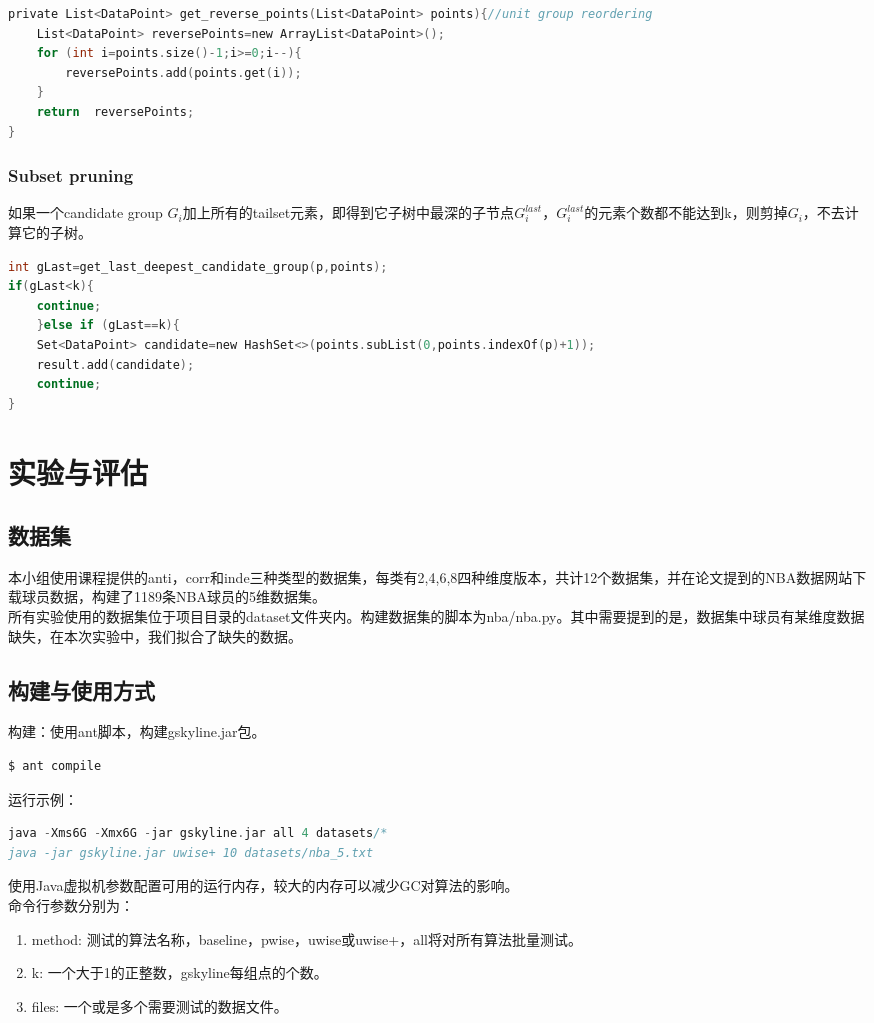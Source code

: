 \documentclass{article}
\begin{document}
\begin{CJK}{UTF8}{gbsn}
\begin{lstlisting}[language=C]
private List<DataPoint> get_reverse_points(List<DataPoint> points){//unit group reordering
    List<DataPoint> reversePoints=new ArrayList<DataPoint>();
    for (int i=points.size()-1;i>=0;i--){
        reversePoints.add(points.get(i));
    }
    return  reversePoints;
}
\end{lstlisting}

\subsubsection{Subset pruning}

如果一个candidate group $G_{i}$加上所有的tailset元素，即得到它子树中最深的子节点$G_{i}^{last}$，$G_{i}^{last}$的元素个数都不能达到k，则剪掉$G_{i}$，不去计算它的子树。
\begin{lstlisting}[language=C]
int gLast=get_last_deepest_candidate_group(p,points);
if(gLast<k){
    continue;
    }else if (gLast==k){
    Set<DataPoint> candidate=new HashSet<>(points.subList(0,points.indexOf(p)+1));
    result.add(candidate);
    continue;
}
\end{lstlisting}

\section{实验与评估}
\subsection{数据集}
本小组使用课程提供的anti，corr和inde三种类型的数据集，每类有2,4,6,8四种维度版本，共计12个数据集，并在论文提到的NBA数据网站下载球员数据，构建了1189条NBA球员的5维数据集。\\
所有实验使用的数据集位于项目目录的dataset文件夹内。构建数据集的脚本为nba/nba.py。其中需要提到的是，数据集中球员有某维度数据缺失，在本次实验中，我们拟合了缺失的数据。
\subsection{构建与使用方式}
构建：使用ant脚本，构建gskyline.jar包。\\
\begin{lstlisting}[language=C]
$ ant compile
\end{lstlisting}
运行示例：
\begin{lstlisting}[language=C]
java -Xms6G -Xmx6G -jar gskyline.jar all 4 datasets/*
java -jar gskyline.jar uwise+ 10 datasets/nba_5.txt
\end{lstlisting}
使用Java虚拟机参数配置可用的运行内存，较大的内存可以减少GC对算法的影响。\\
命令行参数分别为：\\
\begin{enumerate}
	\item method: 测试的算法名称，baseline，pwise，uwise或uwise+，all将对所有算法批量测试。
	\item k: 一个大于1的正整数，gskyline每组点的个数。
	\item files: 一个或是多个需要测试的数据文件。
\end{enumerate}

\end{CJK}
\end{document}
